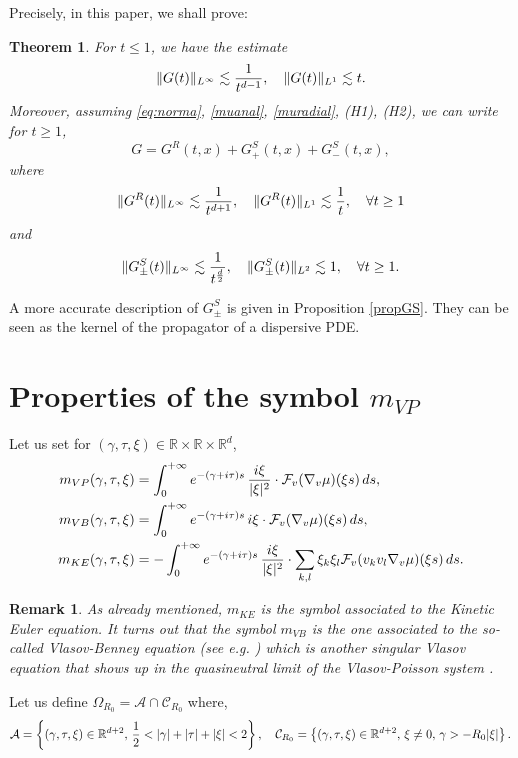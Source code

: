 \documentclass[11pt]{amsart}
\numberwithin{equation}{section}
\newcommand{\R}{\mathbb{R}}
\newcommand{\na}{\nabla}
\newtheorem{thm}{Theorem}[section]
\newtheorem{rem}{Remark}[section]
\begin{document}
Precisely, in this paper, we shall prove: 
 \begin{thm}
 \label{theokernel}
 For $t \leq 1$, we have the estimate
 $$ \|G(t) \|_{L^\infty} \lesssim { 1 \over t^{d-1}}, \quad \|G(t) \|_{L^1} \lesssim t.$$
 Moreover, 
 assuming \eqref{eq:norma}, \eqref{muanal}, \eqref{muradial}, (H1), (H2), we can write for $t \geq 1$,
 $$ G= G^{R}(t,x) + G^S_{+}(t,x)+ G^S_{-}(t,x), $$
 where 
 $$  \|G^{R}(t) \|_{L^\infty} \lesssim { 1 \over t^{d+1}}, \quad \|G^{R}(t) \|_{L^1} \lesssim {1 \over t}, \quad \forall t \geq 1$$
 and 
 $$   \|G^{S}_{\pm}(t) \|_{L^\infty} \lesssim { 1 \over t^{d\over 2}}, \quad \|G^{S}_{\pm}(t) \|_{L^2} \lesssim 1, \quad \forall t \geq 1.$$
  \end{thm}
A more accurate description of $G^S_\pm$ is given in Proposition \ref{propGS}. They  can be seen as the kernel of the propagator
 of a dispersive PDE.
\section{Properties of the symbol $m_{VP}$}

Let us set for $(\gamma, \tau, \xi) \in \R \times \R \times \R^d$,
\begin{align}
 m_{VP}(\gamma, \tau, \xi)&= \int_{0}^{+ \infty} e^{-(\gamma + i \tau)s}\, {i \xi \over  |\xi|^2}\cdot  \mathcal{F}_v( \na_v \mu)(\xi s) \, d s, \\
  m_{VB}(\gamma, \tau, \xi)&= \int_{0}^{+ \infty} e^{-(\gamma + i \tau)s}\, {i \xi}\cdot  \mathcal{F}_v( \na_v \mu)(\xi s) \, d s, \\
  m_{KE}(\gamma, \tau, \xi)&= - \int_{0}^{+ \infty} e^{-(\gamma + i \tau)s}\, {i \xi \over  |\xi|^2}\cdot   \sum_{k,l} \xi_k \xi_l \mathcal{F}_v( v_k v_l \na_v \mu)(\xi s) \, d s.
\end{align}


\begin{rem}
As already mentioned, $m_{KE}$ is the symbol associated to the Kinetic Euler equation.
It turns out that the symbol 
 $m_{VB}$ is the one associated to the so-called \emph{Vlasov-Benney} equation (see e.g. \cite{Bardos}) which is another singular Vlasov equation that shows up in the quasineutral limit of the Vlasov-Poisson system \cite{HKR}.
\end{rem}



 Let us  define $\Omega_{R_{0}} = \mathcal{A} \cap \mathcal{C}_{R_{0}}$ where, 
  $$\mathcal{A}=\left\{ (\gamma, \tau,  \xi) \in \mathbb{R}^{d+2}, \, { 1 \over 2} < | \gamma |+ | \tau | + |\xi| < 2 \right\}, 
   \quad   \mathcal{C}_{R_{0}}= \left\{ (\gamma, \tau , \xi) \in \mathbb{R}^{d+2}, \, \xi \neq 0, \,  \gamma >- R_{0} | \xi|\right\}.  $$
 
\end{document}

